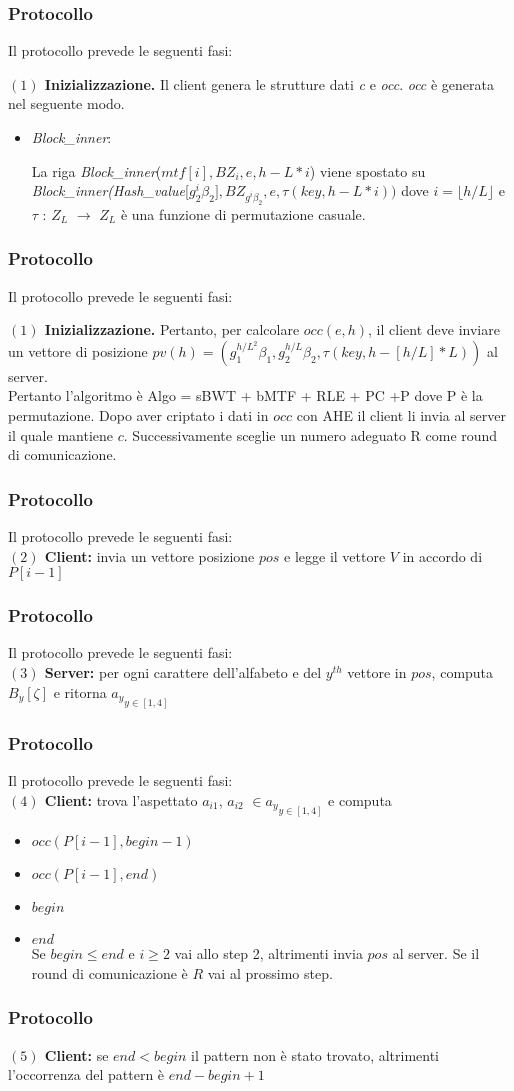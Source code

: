 \documentclass{beamer}
\begin{document}
\begin{frame}
\frametitle{Protocollo}
Il protocollo prevede le seguenti fasi:

\textbf{$(1)$ Inizializzazione.} Il client genera le strutture dati \textit{c} e \textit{occ}. \textit{occ} è generata nel seguente modo.

\begin{itemize}
	\item \textit{Block\_inner}:
	

	La riga \textit{Block\_inner}($mtf[i],BZ_{i}, e, h-L*i$) viene spostato su \textit{Block\_inner}\textit{(Hash\_value}[$g^{i}_{2}\beta_{2}], BZ_{g^{i}{\beta_{2}}}, e, \tau(key, h-L*i))$
	dove $i = \lfloor h/L\rfloor$ e $\tau$ : $Z_{L} $ $\rightarrow$ $Z_{L} $ è una funzione di permutazione casuale.
\end{itemize}
\end{frame}
\begin{frame}
\frametitle{Protocollo}
Il protocollo prevede le seguenti fasi:

\textbf{$(1)$ Inizializzazione.}
	Pertanto, per calcolare $occ(e, h)$, il client deve inviare un vettore di posizione $pv(h) = (g_{1}^{h/L^{2}} \beta_{1}, g_{2}^{h/L} \beta_{2}, \tau(key, h-[h/L] * L) )$ al server.\\ 
	
	Pertanto l'algoritmo è Algo = sBWT + bMTF + RLE + PC +P dove P è la permutazione. Dopo aver criptato i dati in $occ$ con AHE il client li invia al server il quale mantiene $c$. Successivamente sceglie un numero adeguato R come round di comunicazione.
\end{frame}

\begin{frame}
\frametitle{Protocollo}
Il protocollo prevede le seguenti fasi:\\
\textbf{$(2)$ Client:} invia un vettore posizione $pos$ e legge il vettore $V$ in accordo di $P[i-1]$
\end{frame}

\begin{frame}
\frametitle{Protocollo}
Il protocollo prevede le seguenti fasi:\\
\textbf{$(3)$ Server:} per ogni carattere dell'alfabeto e del $y^{th}$ vettore in $pos$, computa $B_{y}[\zeta]$ e ritorna ${a_{y}}_{y\in[1,4]}$
\end{frame}

\begin{frame}
\frametitle{Protocollo}
Il protocollo prevede le seguenti fasi:\\
\textbf{$(4)$ Client:} trova l'aspettato $a_{i1}$, $a_{i2}$ $\in {a_{y}}_{y\in[1,4]} $ e computa
\begin{itemize}
	\item $occ(P[i-1], begin-1)$
	\item $occ(P[i-1], end)$
	\item $begin$
	\item $end$
\\	Se $begin \leq end$ e $i \geq 2 $ vai allo step 2, altrimenti invia $pos$ al server. Se il round di comunicazione è $R$ vai al prossimo step.
\end{itemize}
\end{frame}

\begin{frame}
\frametitle{Protocollo}
\textbf{$(5)$ Client:} se $end < begin$ il pattern non è stato trovato, altrimenti l'occorrenza del pattern è $end - begin +1$
\end{frame}
\end{document}
